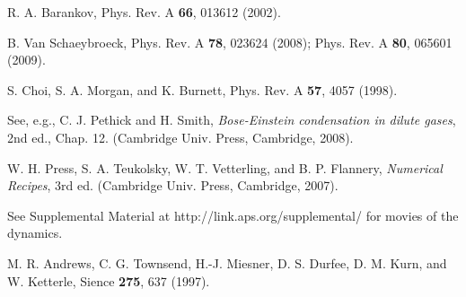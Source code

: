 \documentclass[pra,aps,superscriptaddress,twocolumn]{revtex4-2}
\begin{document}
\begin{thebibliography}{99}
R. A. Barankov,
Phys. Rev. A \textbf{66}, 013612 (2002).

B. Van Schaeybroeck,
Phys. Rev. A \textbf{78}, 023624 (2008);
Phys. Rev. A \textbf{80}, 065601 (2009).

S. Choi, S. A. Morgan, and K. Burnett,
Phys. Rev. A \textbf{57}, 4057 (1998).

See, e.g., C. J. Pethick and H. Smith, {\it Bose-Einstein condensation in
dilute gases}, 2nd ed., Chap. 12. (Cambridge Univ. Press, Cambridge, 2008).

 W. H. Press, S. A. Teukolsky, W. T. Vetterling, and B. P. Flannery,
{\it Numerical Recipes}, 3rd ed. (Cambridge Univ. Press, Cambridge, 2007).

See Supplemental Material at http://link.aps.org/supplemental/
for movies of the dynamics.

M. R. Andrews, C. G. Townsend, H.-J. Miesner, D. S. Durfee, D. M. Kurn, and
W. Ketterle, Sience \textbf{275}, 637 (1997).

\end{thebibliography}
\end{document}
